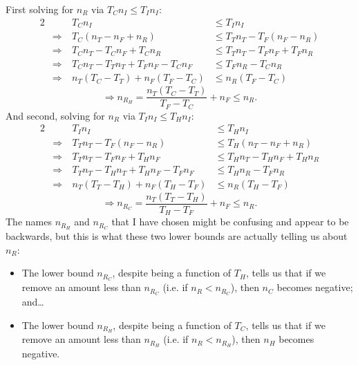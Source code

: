 \documentclass{article}
\begin{document}
First solving for $n_R$ via $T_C n_I\le T_I n_I$:
\begin{alignat*}{2}
    &\phantom{\Rightarrow\ }&
    T_C n_I &\le T_I n_I \\
    &{\Rightarrow\ }&
    T_C(n_T-n_F+n_R) &\le T_T n_T - T_F(n_F-n_R) \\
    &{\Rightarrow\ }&
    T_C n_T - T_C n_F + T_C n_R &\le T_T n_T - T_F n_F + T_F n_R \\
    &{\Rightarrow\ }&
    T_C n_T - T_T n_T + T_F n_F - T_C n_F &\le T_F n_R - T_C n_R \\
    &{\Rightarrow\ }&
    n_T(T_C - T_T) + n_F(T_F - T_C) &\le n_R(T_F - T_C)
\end{alignat*}
\begin{equation}
    \Rightarrow n_{R_H} = \frac{n_T(T_C - T_T)}{T_F - T_C} + n_F \le n_R.
    \label{eq:C-bound}
\end{equation}
And second, solving for $n_R$ via $T_I n_I\le T_H n_I$:
\begin{alignat*}{2}
    &\phantom{\Rightarrow\ }&
    T_I n_I &\le T_H n_I \\
    &{\Rightarrow\ }&
    T_T n_T - T_F(n_F-n_R) &\le T_H(n_T-n_F+n_R) \\
    &{\Rightarrow\ }&
    T_T n_T - T_F n_F + T_H n_F &\le T_H n_T - T_H n_F + T_H n_R \\
    &{\Rightarrow\ }&
    T_T n_T - T_H n_T + T_H n_F - T_F n_F &\le T_H n_R - T_F n_R \\
    &{\Rightarrow\ }&
    n_T(T_T - T_H) + n_F(T_H - T_F) &\le n_R(T_H - T_F)
\end{alignat*}
\begin{equation}
    \Rightarrow n_{R_C} = \frac{n_T(T_T - T_H)}{T_H - T_F} + n_F \le n_R.
    \label{eq:H-bound}
\end{equation}
The names $n_{R_H}$ and $n_{R_C}$ that I have chosen might be confusing and appear to be backwards,
but this is what these two lower bounds are actually telling us about $n_R$:
\begin{itemize}
    \item The lower bound $n_{R_C}$, despite being a function of $T_H$,
        tells us that if we remove an amount less than $n_{R_C}$ (i.e. if $n_R<n_{R_C}$),
        then $n_C$ becomes negative; and\ldots
    \item The lower bound $n_{R_H}$, despite being a function of $T_C$,
        tells us that if we remove an amount less than $n_{R_H}$ (i.e. if $n_R<n_{R_H}$),
        then $n_H$ becomes negative.
\end{itemize}
\end{document}
